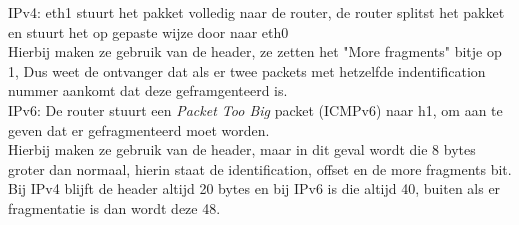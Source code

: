 IPv4: eth1 stuurt het pakket volledig naar de router, de router splitst het pakket en stuurt het op gepaste wijze door naar eth0\\

Hierbij maken ze gebruik van de header, ze zetten het "More fragments" bitje op 1, Dus weet de ontvanger dat als er twee packets met hetzelfde indentification nummer aankomt dat deze geframgenteerd is.\\

IPv6: De router stuurt een \textit{Packet Too Big} packet (ICMPv6) naar h1, om aan te geven dat er gefragmenteerd moet worden.\\
Hierbij maken ze gebruik van de header, maar in dit geval wordt die 8 bytes groter dan normaal, hierin staat de identification, offset en de more fragments bit. \\

Bij IPv4 blijft de header altijd 20 bytes en bij IPv6 is die altijd 40, buiten als er fragmentatie is dan wordt deze 48.\\

